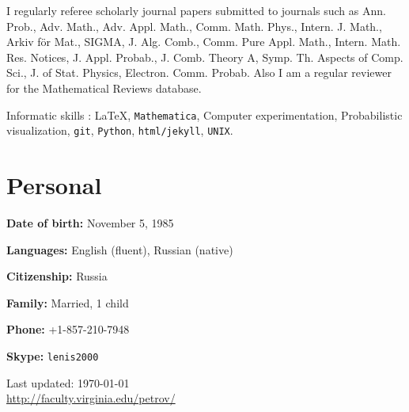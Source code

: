 \documentclass[letterpaper,11pt]{article}
\def\footerlink{http://faculty.virginia.edu/petrov/}
\begin{document}

\medskip


I regularly referee scholarly journal papers
submitted to journals such as 
Ann. Prob., 
Adv. Math., 
Adv. Appl. Math., 
Comm. Math. Phys.,
Intern. J. Math.,
Arkiv f\"or Mat.,
SIGMA,
J. Alg. Comb.,
Comm. Pure Appl. Math.,
Intern. Math. Res. Notices,
J. Appl. Probab.,
J. Comb. Theory A,
Symp. Th. Aspects of Comp. Sci.,
J. of Stat. Physics,
Electron. Comm. Probab.
Also I am a regular reviewer for the
Mathematical Reviews database.






\medskip

Informatic skills : 
\LaTeX, 
\texttt{Mathematica}, 
Computer experimentation,
Probabilistic visualization,
\texttt{git},
\texttt{Python}, 
\texttt{html/jekyll}, \texttt{UNIX}.

\section*{Personal}

\textbf{Date of birth:} November 5, 1985

\textbf{Languages:} English (fluent), Russian (native)

\textbf{Citizenship:} Russia

\textbf{Family:} Married, 1 child

\textbf{Phone:} +1-857-210-7948

\textbf{Skype:} \texttt{lenis2000}


\bigskip

\begin{center}
  \begin{footnotesize}
    Last updated: \today \\
    \href{\footerlink}{\url{\footerlink}}
  \end{footnotesize}
\end{center}
 
\end{document}
